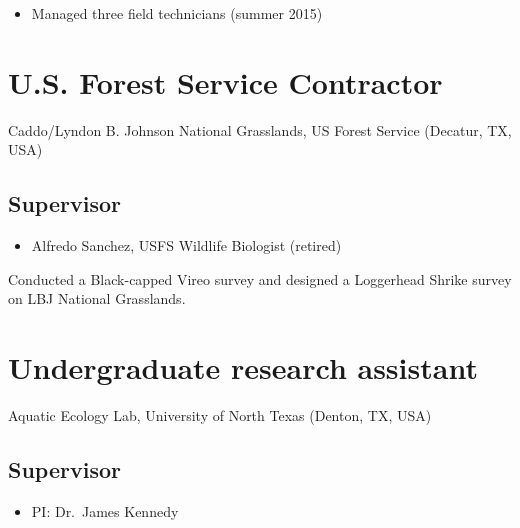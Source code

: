 \documentclass[
  letterpaper,
  DIV=11,
  numbers=noendperiod,
  oneside]{scrreprt}
\providecommand{\tightlist}{%
  \setlength{\itemsep}{0pt}\setlength{\parskip}{0pt}}\usepackage{longtable,booktabs,array}
\begin{document}
\begin{itemize}
\tightlist
\item
  Managed three field technicians (summer 2015)
\end{itemize}

\section{U.S. Forest Service
Contractor}\label{u.s.-forest-service-contractor}

Caddo/Lyndon B. Johnson National Grasslands, US Forest Service (Decatur,
TX, USA)


\subsection{Supervisor}\label{supervisor-2}

\begin{itemize}
\tightlist
\item
  Alfredo Sanchez, USFS Wildlife Biologist (retired)
\end{itemize}

Conducted a Black-capped Vireo survey and designed a Loggerhead Shrike
survey on LBJ National Grasslands.

\section{Undergraduate research
assistant}\label{undergraduate-research-assistant}

Aquatic Ecology Lab, University of North Texas (Denton, TX, USA)


\subsection{Supervisor}\label{supervisor-3}

\begin{itemize}
\tightlist
\item
  PI: Dr.~James Kennedy
\end{itemize}
\end{document}

